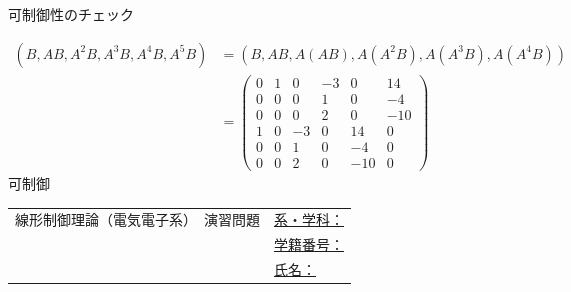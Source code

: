\documentclass[a4paper,11pt]{jreport}
\begin{document}
可制御性のチェック

\begin{align}
 (B,AB, A^2B, A^3B, A^4B, A^5B)
 &=
 (B,AB, A(AB), A(A^2B), A(A^3B), A(A^4B))
\nonumber \\
 &=
 \left(\begin{array}{rrrrrr}
        0 & 1 & 0 & -3& 0 & 14      \\
        0 & 0 & 0 & 1 & 0 & -4      \\
        0 & 0 & 0 & 2 & 0 &-10      \\
	1 & 0 & -3& 0 & 14& 0 \\
	0 & 0 & 1 & 0 & -4& 0 \\
	0 & 0 & 2 & 0 &-10& 0 
       \end{array}\right)
\nonumber
\end{align}
可制御

\newpage
\begin{tabular}{cl}
\hspace*{2cm}
{\large 線形制御理論（電気電子系）　演習問題}
\hspace{1cm}
&
\underline{系・学科：\hspace{3cm}}
\\[2mm]
&\underline{学籍番号：\hspace{3cm}}
\\[2mm]
&\underline{氏名：\hspace{5cm}}
\end{tabular}
\ \\
\end{document}
